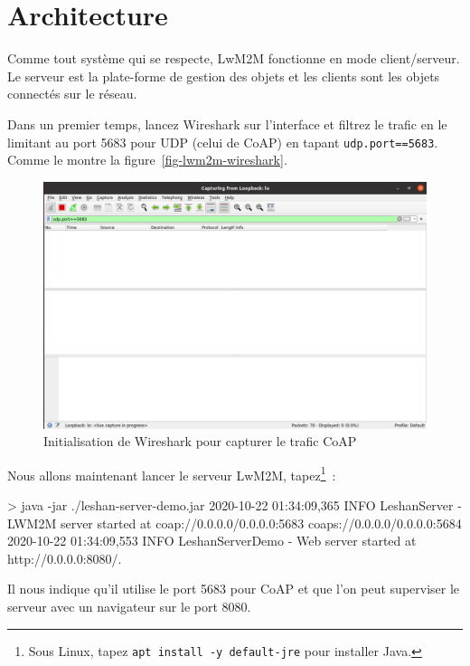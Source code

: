 \section{Architecture}

Comme tout système qui se respecte, LwM2M fonctionne en mode client/serveur. Le serveur est la plate-forme de gestion des objets et les clients sont les objets connectés sur le réseau.

Dans un premier temps, lancez Wireshark sur l'interface \textit{} et filtrez le trafic en le limitant au port 5683 pour UDP (celui de CoAP) en tapant \texttt{udp.port==5683}. Comme le montre la figure~\vref{fig-lwm2m-wireshark}.

\begin{figure}[tbp]
\centerline{\includegraphics[width=1\columnwidth]{Pictures/lwM2M-wireshark.png}}
\caption{Initialisation de Wireshark pour capturer le trafic CoAP}
\label{fig-lwm2m-wireshark}
\end{figure}

Nous allons maintenant lancer le serveur LwM2M, tapez\footnote{Sous Linux, tapez \texttt{apt install -y default-jre} pour installer Java.}~:

\begin{termc}[backgroundcolor=\color{orange!40}, basicstyle=\ttfamily\small, escapechar=@] %
> java -jar ./leshan-server-demo.jar
2020-10-22 01:34:09,365 INFO LeshanServer - LWM2M server started at
coap://0.0.0.0/0.0.0.0:5683 coaps://0.0.0.0/0.0.0.0:5684
2020-10-22 01:34:09,553 INFO LeshanServerDemo - Web server started at 
http://0.0.0.0:8080/.
\end{termc}

Il nous indique qu'il utilise le port 5683 pour CoAP et que l'on peut superviser le serveur avec un navigateur sur le port 8080.

